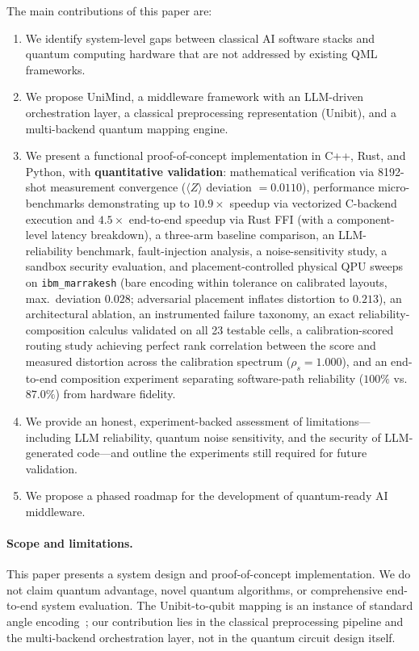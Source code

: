 ﻿\documentclass[12pt,a4paper]{article}
\begin{document}
The main contributions of this paper are:

\begin{enumerate}[leftmargin=2em]
    \item We identify system-level gaps between classical AI software stacks and quantum computing hardware that are not addressed by existing QML frameworks.
    \item We propose UniMind, a middleware framework with an LLM-driven orchestration layer, a classical preprocessing representation (Unibit), and a multi-backend quantum mapping engine.
    \item We present a functional proof-of-concept implementation in C++, Rust, and Python, with \textbf{quantitative validation}: mathematical verification via 8192-shot measurement convergence ($\langle Z \rangle$ deviation $= 0.0110$), performance micro-benchmarks demonstrating up to $10.9\times$ speedup via vectorized C-backend execution and $4.5\times$ end-to-end speedup via Rust FFI (with a component-level latency breakdown), a three-arm baseline comparison, an LLM-reliability benchmark, fault-injection analysis, a noise-sensitivity study, a sandbox security evaluation, and placement-controlled physical QPU sweeps on \texttt{ibm\_marrakesh} (bare encoding within tolerance on calibrated layouts, max.\ deviation $0.028$; adversarial placement inflates distortion to $0.213$), an architectural ablation, an instrumented failure taxonomy, an exact reliability-composition calculus validated on all 23 testable cells, a calibration-scored routing study achieving perfect rank correlation between the score and measured distortion across the calibration spectrum ($\rho_s = 1.000$), and an end-to-end composition experiment separating software-path reliability ($100\%$ vs.\ $87.0\%$) from hardware fidelity.
    \item We provide an honest, experiment-backed assessment of limitations---including LLM reliability, quantum noise sensitivity, and the security of LLM-generated code---and outline the experiments still required for future validation.
    \item We propose a phased roadmap for the development of quantum-ready AI middleware.
\end{enumerate}

\paragraph{Scope and limitations.} This paper presents a system design and proof-of-concept implementation. We do not claim quantum advantage, novel quantum algorithms, or comprehensive end-to-end system evaluation. The Unibit-to-qubit mapping is an instance of standard angle encoding~\cite{schuld2021}; our contribution lies in the classical preprocessing pipeline and the multi-backend orchestration layer, not in the quantum circuit design itself.
\end{document}
